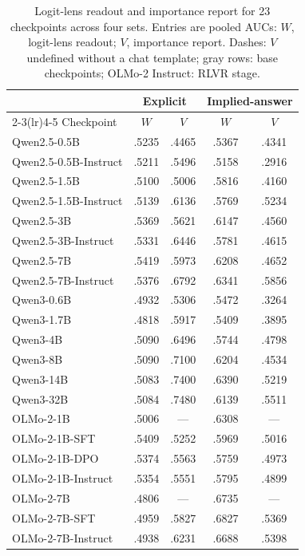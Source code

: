 \begin{table}[t]
\centering
\caption{Logit-lens readout and importance report for 23 checkpoints across four sets. Entries are pooled AUCs: $W$,
logit-lens readout; $V$, importance report. Dashes: $V$ undefined without a chat template;
gray rows: base checkpoints; OLMo-2 Instruct: RLVR stage.}
\label{tab:appA1}
\scriptsize
\setlength{\tabcolsep}{4pt}
\begin{tabular}{l*{4}{c}}
\toprule
 & \multicolumn{2}{c}{Explicit} & \multicolumn{2}{c}{Implied-answer} \\
\cmidrule(lr){2-3}\cmidrule(lr){4-5}
Checkpoint & $W$ & $V$ & $W$ & $V$ \\
\midrule
{} Qwen2.5-0.5B & .5235 & .4465 & .5367 & .4341 \\
Qwen2.5-0.5B-Instruct & .5211 & .5496 & .5158 & .2916 \\
 Qwen2.5-1.5B & .5100 & .5006 & .5816 & .4160 \\
Qwen2.5-1.5B-Instruct & .5139 & .6136 & .5769 & .5234 \\
 Qwen2.5-3B & .5369 & .5621 & .6147 & .4560 \\
Qwen2.5-3B-Instruct & .5331 & .6446 & .5781 & .4615 \\
 Qwen2.5-7B & .5419 & .5973 & .6208 & .4652 \\
Qwen2.5-7B-Instruct & .5376 & .6792 & .6341 & .5856 \\
\addlinespace
Qwen3-0.6B & .4932 & .5306 & .5472 & .3264 \\
Qwen3-1.7B & .4818 & .5917 & .5409 & .3895 \\
Qwen3-4B & .5090 & .6496 & .5744 & .4798 \\
Qwen3-8B & .5090 & .7100 & .6204 & .4534 \\
Qwen3-14B & .5083 & .7400 & .6390 & .5219 \\
Qwen3-32B & .5084 & .7480 & .6139 & .5511 \\
\addlinespace
{} OLMo-2-1B & .5006 & --- & .6308 & --- \\
OLMo-2-1B-SFT & .5409 & .5252 & .5969 & .5016 \\
OLMo-2-1B-DPO & .5374 & .5563 & .5759 & .4973 \\
OLMo-2-1B-Instruct & .5354 & .5551 & .5795 & .4899 \\
 OLMo-2-7B & .4806 & --- & .6735 & --- \\
OLMo-2-7B-SFT & .4959 & .5827 & .6827 & .5369 \\
OLMo-2-7B-Instruct & .4938 & .6231 & .6688 & .5398 \\

\end{tabular}
\end{table}
